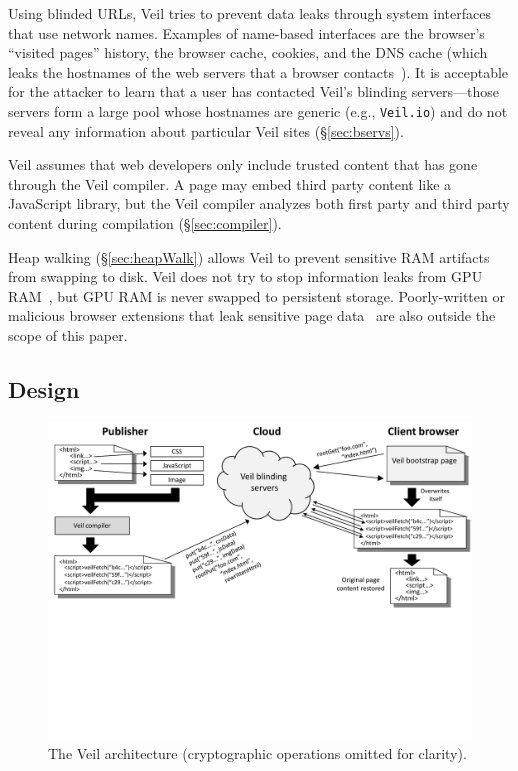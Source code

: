 Using blinded URLs, Veil tries to prevent data leaks
through system interfaces that use network names.
Examples of name-based interfaces are the browser's ``visited pages''
history, the browser cache, cookies, and the DNS
cache (which leaks the hostnames of the web servers
that a browser contacts~\cite{aggarwal10}). It is
acceptable for the attacker to learn that a user
has contacted Veil's blinding servers---those
servers form a large pool whose hostnames are generic
(e.g., \texttt{Veil.io}) and do not reveal
any information about particular Veil sites
(\S\ref{sec:bservs}).

Veil assumes that web developers only include
trusted content that has gone through the Veil
compiler.
A page may embed third party content like a JavaScript
library, but the Veil compiler analyzes both
first party and third party content during compilation
(\S\ref{sec:compiler}).

Heap walking (\S\ref{sec:heapWalk}) allows Veil
to prevent sensitive RAM artifacts from swapping to
disk. Veil does not try to stop information
leaks from GPU RAM~\cite{lee2014}, but GPU RAM
is never swapped to persistent storage. 
Poorly-written or malicious browser extensions that leak
sensitive page data~\cite{lerner13} are also outside the
scope of this paper.

\subsection{Design}
\label{sec:design}

\begin{figure}
	\centering
	\includegraphics[width=\textwidth]{veil-figs/arch_small_cropped}
	\caption{The Veil architecture (cryptographic operations omitted for clarity).}
	\label{fig:arch}
\end{figure}

